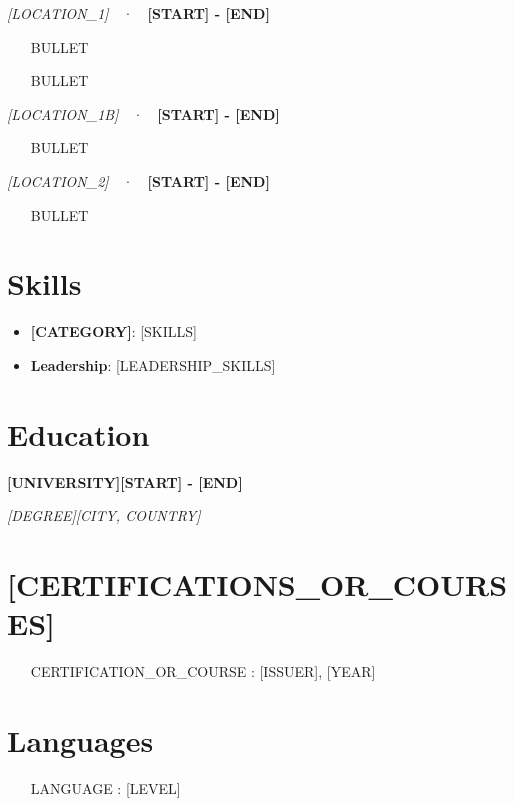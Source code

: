 \documentclass[10pt,letterpaper]{article}
\newcommand{\company}[1]{\needspace{4\baselineskip}\vspace{4pt}{\bfseries #1}\par}
\newcommand{\role}[3]{\needspace{3\baselineskip}{\bfseries\itshape #1}\hfill{\itshape #2}~~·~~\textbf{#3}\par}
\newcommand{\subrole}[3]{\vspace{2pt}\role{#1}{#2}{#3}}
\newcommand{\edu}[4]{\textbf{#1}\hfill\textbf{#2}\par{\itshape #3}\hfill{\itshape #4}\par}
\begin{document}
\company{[COMPANY_1]}
\role{[TITLE_1]}{[LOCATION_1]}{[START] - [END]}
\begin{itemize}
  \item [BULLET]
  \item [BULLET]
\end{itemize}

\subrole{[TITLE_1B]}{[LOCATION_1B]}{[START] - [END]}
\begin{itemize}
  \item [BULLET]
\end{itemize}


\company{[COMPANY_2]}
\role{[TITLE_2]}{[LOCATION_2]}{[START] - [END]}
\begin{itemize}
  \item [BULLET]
\end{itemize}

\section*{Skills}
{\raggedright
\begin{itemize}
  \item \textbf{[CATEGORY]}: [SKILLS]
  \item \textbf{Leadership}: [LEADERSHIP_SKILLS]
\end{itemize}\par}

\section*{Education}
\edu{[UNIVERSITY]}{[START] - [END]}{[DEGREE]}{[CITY, COUNTRY]}

\section*{[CERTIFICATIONS_OR_COURSES]}
\begin{itemize}
  \item [CERTIFICATION_OR_COURSE]: [ISSUER], [YEAR]
\end{itemize}

\section*{Languages}
\begin{itemize}
  \item [LANGUAGE]: [LEVEL]
\end{itemize}
\end{document}
